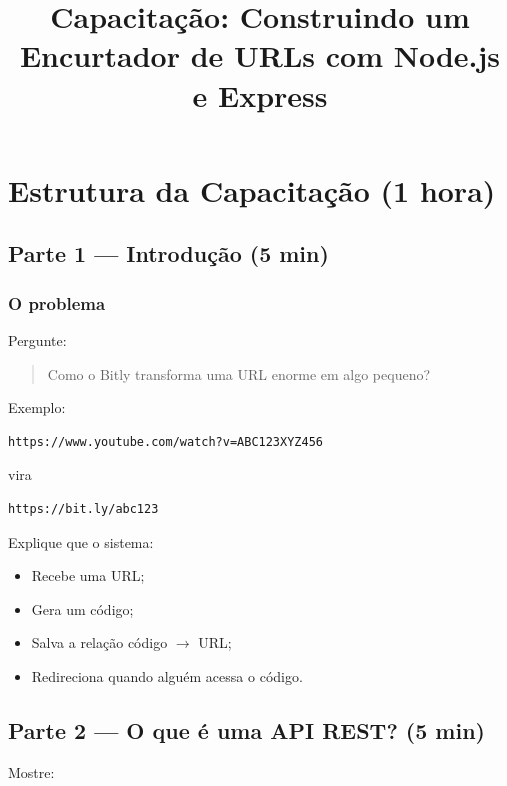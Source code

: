 \documentclass[a4paper,12pt]{article}
\begin{document}
\title{Capacitação: Construindo um Encurtador de URLs com Node.js e Express}
\author{}
\date{}

\maketitle

\section{Estrutura da Capacitação (1 hora)}

\subsection{Parte 1 --- Introdução (5 min)}

\subsubsection{O problema}

Pergunte:

\begin{quote}
Como o Bitly transforma uma URL enorme em algo pequeno?
\end{quote}

Exemplo:

\begin{verbatim}
https://www.youtube.com/watch?v=ABC123XYZ456
\end{verbatim}

vira

\begin{verbatim}
https://bit.ly/abc123
\end{verbatim}

Explique que o sistema:

\begin{itemize}
    \item Recebe uma URL;
    \item Gera um código;
    \item Salva a relação código $\rightarrow$ URL;
    \item Redireciona quando alguém acessa o código.
\end{itemize}

\subsection{Parte 2 --- O que é uma API REST? (5 min)}

Mostre:
\end{document}
